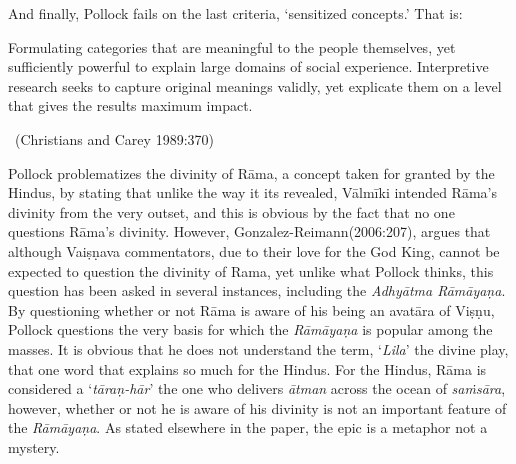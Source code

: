 And finally, Pollock fails on the last criteria, ‘sensitized concepts.’ That is:

\begin{myquote}
Formulating categories that are meaningful to the people themselves, yet sufficiently powerful to explain large domains of social experience. Interpretive research seeks to capture original meanings validly, yet explicate them on a level that gives the results maximum impact.

~\hfill (Christians and Carey 1989:370)
\end{myquote}

Pollock problematizes the divinity of Rāma, a concept taken for granted by the Hindus, by stating that unlike the way it its revealed, Vālmīki intended Rāma’s divinity from the very outset, and this is obvious by the fact that no one questions Rāma’s divinity. However, Gonzalez-Reimann(2006:207), argues that although Vaiṣṇava commentators, due to their love for the God King, cannot be expected to question the divinity of Rama, yet unlike what Pollock thinks, this question has been asked in several instances, including the \textit{Adhyātma Rāmāyaṇa}. By questioning whether or not Rāma is aware of his being an avatāra of Viṣṇu, Pollock questions the very basis for which the \textit{Rāmāyaṇa} is popular among the masses. It is obvious that he does not understand the term, ‘\textit{Lila}’ the divine play, that one word that explains so much for the Hindus. For the Hindus, Rāma is considered a ‘\textit{tāraṇ-hār}’ the one who delivers \textit{ātman} across the ocean of \textit{saṁsāra}, however, whether or not he is aware of his divinity is not an important feature of the \textit{Rāmāyaṇa}. As stated elsewhere in the paper, the epic is a metaphor not a mystery.

